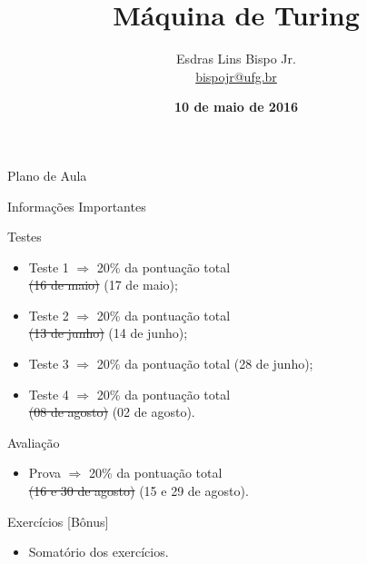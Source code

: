 \documentclass[xcolor=dvipsnames,table]{beamer}
\title{Máquina de Turing}
\author{
  Esdras Lins Bispo Jr. \\ \url{bispojr@ufg.br}
  }
\institute{
  Teoria da Computação \\Bacharelado em Ciência da Computação}
\date{\textbf{10 de maio de 2016} }
\begin{document}
	\begin{frame}
		\titlepage
	\end{frame}

	\AtBeginSection{
		\begin{frame}{Sumário}%
    		\tableofcontents[currentsection]
		\end{frame}
	}

	\begin{frame}{Plano de Aula}
		\tableofcontents
	\end{frame}
    
    \begin{frame}[shrink]{Informações Importantes}
		\begin{block}{Testes}
			\begin{itemize}
				\item Teste 1 $\Rightarrow$ 20\% da pontuação total \\\sout{(16 de maio)} (17 de maio);
				\item Teste 2 $\Rightarrow$ 20\% da pontuação total \\\sout{(13 de junho)} (14 de junho);
				\item Teste 3 $\Rightarrow$ 20\% da pontuação total (28 de junho);
				\item Teste 4 $\Rightarrow$  20\% da pontuação total \\\sout{(08 de agosto)} (02 de agosto).
			\end{itemize}
		\end{block}
		\begin{block}{Avaliação}
			\begin{itemize}
				\item Prova $\Rightarrow$  20\% da pontuação total \\\sout{(16 e 30 de agosto)} (15 e 29 de agosto).
			\end{itemize}
		\end{block}
		\begin{block}{Exercícios [Bônus]}
			\begin{itemize}
				\item Somatório dos exercícios.
			\end{itemize}
		\end{block}
	\end{frame}
    
\end{document}
